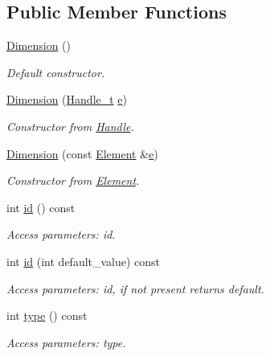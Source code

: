 \subsection*{Public Member Functions}
\begin{DoxyCompactItemize}
\item 
\hyperlink{struct_d_d4hep_1_1_x_m_l_1_1_dimension_a26a1bd5015aa6f00de8ab79682a42e89}{Dimension} ()
\begin{DoxyCompactList}\small\item\em Default constructor. \end{DoxyCompactList}\item 
\hyperlink{struct_d_d4hep_1_1_x_m_l_1_1_dimension_a8b3cbebb82c2b3570c87147680386c99}{Dimension} (\hyperlink{class_d_d4hep_1_1_x_m_l_1_1_handle__t}{Handle\+\_\+t} \hyperlink{_volumes_8cpp_a8a9a1f93e9b09afccaec215310e64142}{e})
\begin{DoxyCompactList}\small\item\em Constructor from \hyperlink{class_d_d4hep_1_1_handle}{Handle}. \end{DoxyCompactList}\item 
\hyperlink{struct_d_d4hep_1_1_x_m_l_1_1_dimension_a692c1ee2c052d427794af750fe2faa6d}{Dimension} (const \hyperlink{class_d_d4hep_1_1_x_m_l_1_1_element}{Element} \&\hyperlink{_volumes_8cpp_a8a9a1f93e9b09afccaec215310e64142}{e})
\begin{DoxyCompactList}\small\item\em Constructor from \hyperlink{class_d_d4hep_1_1_x_m_l_1_1_element}{Element}. \end{DoxyCompactList}\item 
int \hyperlink{struct_d_d4hep_1_1_x_m_l_1_1_dimension_a8cbd93b2d2b12456e84d71711bfdd909}{id} () const
\begin{DoxyCompactList}\small\item\em Access parameters\+: id. \end{DoxyCompactList}\item 
int \hyperlink{struct_d_d4hep_1_1_x_m_l_1_1_dimension_a04bd781479123368354dcb93691e17cc}{id} (int default\+\_\+value) const
\begin{DoxyCompactList}\small\item\em Access parameters\+: id, if not present returns default. \end{DoxyCompactList}\item 
int \hyperlink{struct_d_d4hep_1_1_x_m_l_1_1_dimension_a16f9cd30126ee86d465980e18d404c3d}{type} () const
\begin{DoxyCompactList}\small\item\em Access parameters\+: type. \end{DoxyCompactList}\item 

\end{DoxyCompactItemize}
